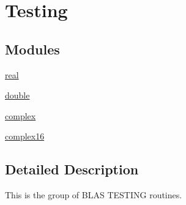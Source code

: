 \hypertarget{group__blastesting}{}\section{Testing}
\label{group__blastesting}
\subsection*{Modules}
\begin{DoxyCompactItemize}
\item 
\hyperlink{group__single__blas__testing}{real}
\item 
\hyperlink{group__double__blas__testing}{double}
\item 
\hyperlink{group__complex__blas__testing}{complex}
\item 
\hyperlink{group__complex16__blas__testing}{complex16}
\end{DoxyCompactItemize}


\subsection{Detailed Description}
This is the group of B\+L\+A\+S T\+E\+S\+T\+I\+N\+G routines. 